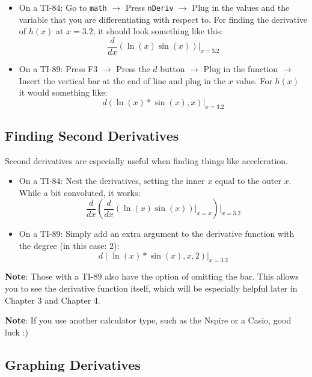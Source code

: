\begin{itemize}
    \item On a TI-84: Go to \verb+math+ \( \to \) Press \verb+nDeriv+ \( \to \) Plug in the values and the variable that you are differentiating with respect to. For finding the derivative of \( h \left( x \right) \) at \( x = 3.2 \), it should look something like this:
    \[ \frac{d}{dx} \left( \ln{\left( x \right)} \sin{\left( x \right)} \right) \vert_{x=3.2} \]
    \item On a TI-89: Press F3 \( \to \) Press the \( d \) button \( \to \) Plug in the function \( \to \) Insert the vertical bar at the end of line and plug in the \( x \) value. For \( h \left( x \right) \) it would something like:
    \[ d \left( \ln{\left( x \right)} * \sin{\left( x \right)}, x \right) \vert_{x=3.2} \]
\end{itemize}

\subsection{Finding Second Derivatives}

Second derivatives are especially useful when finding things like acceleration.

\begin{itemize}
    \item On a TI-84: Nest the derivatives, setting the inner \( x \) equal to the outer \( x \). While a bit convoluted, it works:
    \[ \frac{d}{dx} \left( \frac{d}{dx} \left( \ln{\left( x \right)} \sin{\left( x \right)} \right) \vert_{x=x} \right) \vert_{x=3.2} \]
    \item On a TI-89: Simply add an extra argument to the derivative function with the degree (in this case: \( 2 \)):
    \[ d \left( \ln{\left( x \right)} * \sin{\left( x \right)}, x, 2 \right) \vert_{x=3.2} \]
\end{itemize}

\textbf{Note}: Those with a TI-89 also have the option of omitting the bar. This allows you to see the derivative function itself, which will be especially helpful later in Chapter 3 and Chapter 4.

\textbf{Note}: If you use another calculator type, such as the Nspire or a Casio, good luck :)

\subsection{Graphing Derivatives}

